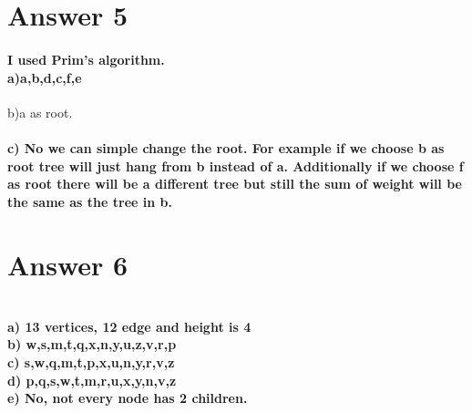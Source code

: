 \documentclass[12pt]{article}
\begin{document}
        
\section*{Answer 5}
\paragraph{I used Prim's algorithm.\\
a)a,b,d,c,f,e\\}
b)a as root. \begin{figure}[H]
	\centering
\end{figure}
\paragraph{c) No we can simple change the root. For example if we choose b as root tree will just hang from b instead of a. Additionally if we choose f as root there will be a different tree but still the sum of weight will be the same as the tree in b.}

\section*{Answer 6}
\paragraph{\\
a) 13 vertices, 12 edge and height is 4 \\
b) w,s,m,t,q,x,n,y,u,z,v,r,p \\
c) s,w,q,m,t,p,x,u,n,y,r,v,z \\
d) p,q,s,w,t,m,r,u,x,y,n,v,z \\
e) No, not every node has 2 children.}
\end{document}
